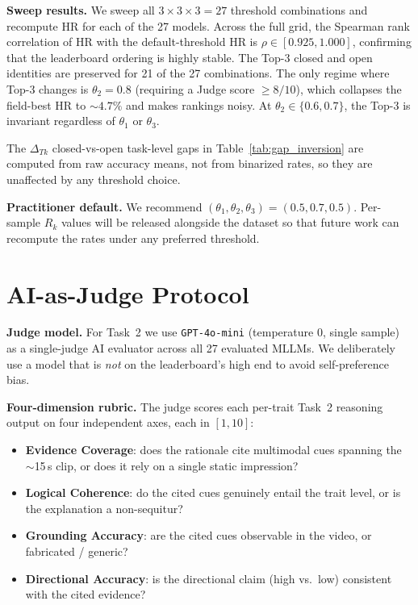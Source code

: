 \documentclass{article}
\begin{document}
\noindent\textbf{Sweep results.} We sweep all $3\!\times\!3\!\times\!3\!=\!27$ threshold combinations and recompute HR for each of the 27 models. Across the full grid, the Spearman rank correlation of HR with the default-threshold HR is $\rho\!\in\![0.925, 1.000]$, confirming that the leaderboard ordering is highly stable. The Top-3 closed and open identities are preserved for 21 of the 27 combinations. The only regime where Top-3 changes is $\theta_2\!=\!0.8$ (requiring a Judge score $\geq\!8/10$), which collapses the field-best HR to $\sim\!4.7\%$ and makes rankings noisy. At $\theta_2\!\in\!\{0.6, 0.7\}$, the Top-3 is invariant regardless of $\theta_1$ or $\theta_3$.

The $\Delta_{Tk}$ closed-vs-open task-level gaps in Table~\ref{tab:gap_inversion} are computed from raw accuracy means, not from binarized rates, so they are unaffected by any threshold choice.

\noindent\textbf{Practitioner default.} We recommend $(\theta_1, \theta_2, \theta_3)\!=\!(0.5, 0.7, 0.5)$. Per-sample $R_k$ values will be released alongside the dataset so that future work can recompute the rates under any preferred threshold.

\section{AI-as-Judge Protocol}
\label{app:judge}

\noindent\textbf{Judge model.} For Task~2 we use \texttt{GPT-4o-mini} (temperature $0$, single sample) as a single-judge AI evaluator across all 27 evaluated MLLMs. We deliberately use a model that is \emph{not} on the leaderboard's high end to avoid self-preference bias.

\noindent\textbf{Four-dimension rubric.} The judge scores each per-trait Task~2 reasoning output on four independent axes, each in $[1, 10]$:

\begin{itemize}[leftmargin=1.3em, itemsep=1pt, topsep=2pt]
\item \textbf{Evidence Coverage}: does the rationale cite multimodal cues spanning the $\sim$15\,s clip, or does it rely on a single static impression?
\item \textbf{Logical Coherence}: do the cited cues genuinely entail the trait level, or is the explanation a non-sequitur?
\item \textbf{Grounding Accuracy}: are the cited cues observable in the video, or fabricated / generic?
\item \textbf{Directional Accuracy}: is the directional claim (high vs.\ low) consistent with the cited evidence?
\end{itemize}
\end{document}

